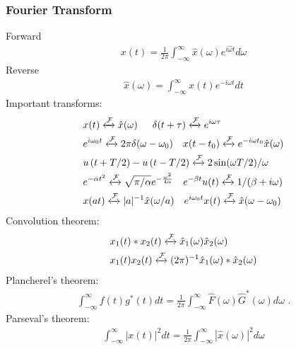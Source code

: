 \documentclass[6pt,landscape,a4paper]{article}
\begin{document}
\begin{multicols*}{5}
\subsubsection*{Fourier Transform}
Forward
\vspace{-1em}
\begin{align*}
x(t) = \frac{1}{2\pi}\textstyle\int_{-\infty}^{\infty}\hat{x}(\omega)e^{i\hat{\omega}t}d\omega
\end{align*}
Reverse
\vspace{-1em}
\begin{align*}
\hat{x}(\omega)=\textstyle\int_{-\infty}^{\infty} x(t) e^{-i\omega t}dt
\end{align*}
Important transforms:
\begin{align*}
 & x(t)  \xleftrightarrow{\mathcal{F}}  \hat{x}(\omega) \hspace{1.5em}  \delta(t+\tau) \xleftrightarrow{\mathcal{F}}  e^{i\omega \tau}\\
&    e^{i\omega_0 t} \xleftrightarrow{\mathcal{F}}  2\pi \delta(\omega-\omega_0)  \hspace{1em}    x(t-t_0) \xleftrightarrow{\mathcal{F}} e^{-i\omega t_0}\hat{x}(\omega)     \\
&    u\left(t+T/2\right) - u\left(t-T/2\right) \xleftrightarrow{\mathcal{F}} 2\sin(\omega T/2)/\omega\\
&    e^{-\alpha t^2} \xleftrightarrow{\mathcal{F}} \sqrt{\pi/\alpha} e^{-\frac{\omega^2}{4\alpha}} \hspace{1em}    e^{-\beta t} u(t) \xleftrightarrow{\mathcal{F}} 1/(\beta + i\omega)\\
&     x(at) \xleftrightarrow{\mathcal{F}}  |a|^{-1}\hat{x}(\omega/a)  \hspace{1em}   e^{i\omega_0 t}x(t) \xleftrightarrow{\mathcal{F}}  \hat{x}(\omega - \omega_0)  
\end{align*}
Convolution theorem:
\begin{align*}
&x_1(t)*x_2(t) \xleftrightarrow{\mathcal{F}} \hat{x}_1(\omega)\hat{x}_2(\omega) \\
&x_1(t)x_2(t) \xleftrightarrow{\mathcal{F}} (2\pi)^{-1}\hat{x}_1(\omega) * \hat{x}_2(\omega)
\end{align*}
Plancherel's theorem:
\begin{align*}
        \textstyle\int_{-\infty}^{\infty} f(t) g^*(t) dt = \frac{1}{2\pi} \textstyle\int_{-\infty}^{\infty}  \hat{F}(\omega)\hat{G}^*(\omega) d\omega\,\,.
\end{align*}
Parseval's theorem:
\begin{align*}
        \textstyle\int_{-\infty}^{\infty} |x(t)|^2 dt = \frac{1}{2\pi} \textstyle\int_{-\infty}^{\infty} | \hat{x}(\omega)|^2 d\omega
\end{align*}

\end{multicols*}
\end{document}
